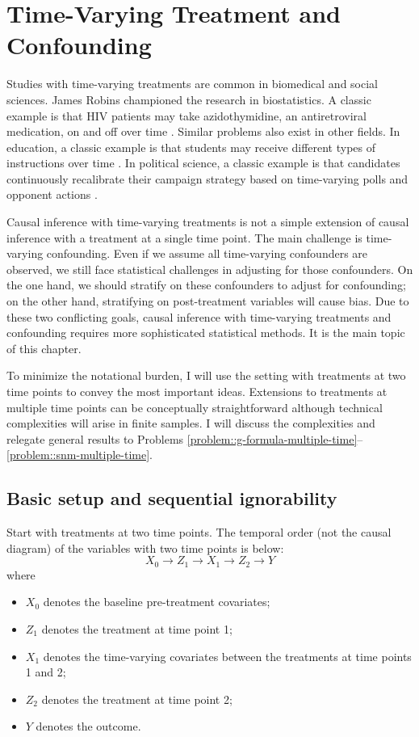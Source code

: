  
\chapter{Time-Varying Treatment and Confounding}
 \label{chapter::timevarying}
 

Studies with time-varying treatments are common in biomedical and social sciences. James Robins championed the research in biostatistics. 
A classic example is that HIV patients may take azidothymidine, an antiretroviral medication, on and off over time \citep{robins2000marginal, hernan2000marginal}. Similar problems also exist in other fields.  In education, a classic example is that students may receive different types of instructions over time \citep{hong2008causal}. In political science, a classic example is that candidates continuously recalibrate their campaign strategy based on time-varying polls and opponent actions \citep{blackwell2013framework}. 


Causal inference with time-varying treatments is not a simple extension of causal inference with a treatment at a single time point. The main challenge is time-varying confounding. Even if we assume all time-varying confounders are observed, we still face statistical challenges in adjusting for those confounders. On the one hand, we should stratify on these confounders to adjust for confounding; on the other hand, stratifying on post-treatment variables will cause bias. Due to these two conflicting goals, causal inference with time-varying treatments and confounding requires more sophisticated statistical methods. It is the main topic of this chapter. 

 


To minimize the notational burden, I will use the setting with treatments at two time points to convey the most important ideas. Extensions to treatments at multiple time points can be conceptually straightforward although technical complexities will arise in finite samples. I will discuss the complexities and relegate general results to Problems \ref{problem::g-formula-multiple-time}--\ref{problem::snm-multiple-time}. 



\section{Basic setup and sequential ignorability}


Start with treatments at two time points. The temporal order (not the causal diagram) of the variables with two time points is below:
$$
X_0 \rightarrow Z_1 \rightarrow X_1 \rightarrow Z_2 \rightarrow Y 
$$
where 
\begin{itemize}
\item
$X_0$ denotes the baseline pre-treatment covariates;
\item
$Z_1$ denotes the treatment at time point 1;
\item
$X_1$ denotes the time-varying covariates between the treatments at time points 1 and 2;
\item
$Z_2$ denotes the treatment at time point 2;
\item
$Y$ denotes the outcome. 
\end{itemize}


